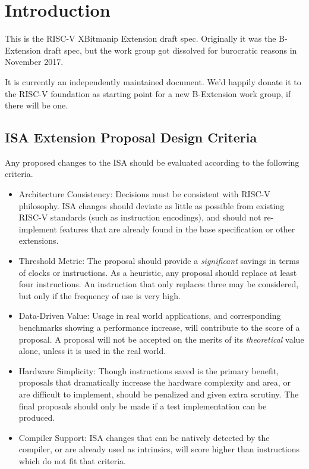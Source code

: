 \chapter{Introduction}

This is the RISC-V XBitmanip Extension draft spec. Originally it was the
B-Extension draft spec, but the work group got dissolved for burocratic
reasons in November 2017.

It is currently an independently maintained document. We'd happily donate
it to the RISC-V foundation as starting point for a new B-Extension work
group, if there will be one.

\section{ISA Extension Proposal Design Criteria}

Any proposed changes to the ISA should be evaluated according to the following
criteria.

\begin{itemize}
\item
  Architecture Consistency: Decisions must be consistent with RISC-V
  philosophy. ISA changes should deviate as little as possible from
  existing RISC-V standards (such as instruction encodings), and should
  not re-implement features that are already found in the base
  specification or other extensions.
\item
  Threshold Metric: The proposal should provide a \emph{significant}
  savings in terms of clocks or instructions. As a heuristic, any
  proposal should replace at least four instructions. An instruction
  that only replaces three may be considered, but only if the frequency
  of use is very high.
\item
  Data-Driven Value: Usage in real world applications, and corresponding
  benchmarks showing a performance increase, will contribute to the
  score of a proposal. A proposal will not be accepted on the merits of
  its \emph{theoretical} value alone, unless it is used in the real
  world.
\item
  Hardware Simplicity: Though instructions saved is the primary benefit,
  proposals that dramatically increase the hardware complexity and area,
  or are difficult to implement, should be penalized and given extra
  scrutiny. The final proposals should only be made if a test
  implementation can be produced.
\item
  Compiler Support: ISA changes that can be natively detected by the
  compiler, or are already used as intrinsics, will score higher than
  instructions which do not fit that criteria.
\end{itemize}

